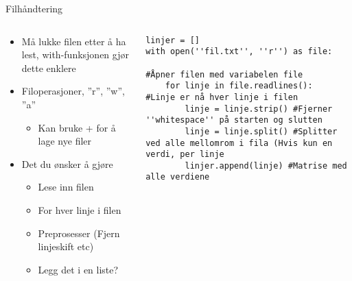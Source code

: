 \documentclass[screen, aspectratio=169]{beamer}
\begin{document}
\begin{frame}[fragile]{Filhåndtering}
	\begin{columns}
		\begin{column}{.4\textwidth}
			\begin{itemize}
				\item Må lukke filen etter å ha lest, with-funksjonen gjør dette enklere
				\item Filoperasjoner, ''r'', ''w'', ''a''
				\begin{itemize}
					\item Kan bruke + for å lage nye filer
				\end{itemize}
				\item Det du ønsker å gjøre
				\begin{itemize}
				    \item Lese inn filen
				    \item For hver linje i filen
				    \item Preprosesser (Fjern linjeskift etc)
				    \item Legg det i en liste? 
				\end{itemize}
			\end{itemize}
		\end{column}
		\begin{column}{.6\textwidth}
			\begin{lstlisting}
linjer = []
with open(''fil.txt'', ''r'') as file:

#Åpner filen med variabelen file
    for linje in file.readlines():
#Linje er nå hver linje i filen
        linje = linje.strip() #Fjerner ''whitespace'' på starten og slutten
        linje = linje.split() #Splitter ved alle mellomrom i fila (Hvis kun en verdi, per linje 
        linjer.append(linje) #Matrise med alle verdiene
			\end{lstlisting}
		\end{column}
	\end{columns}
\end{frame}
\end{document}
